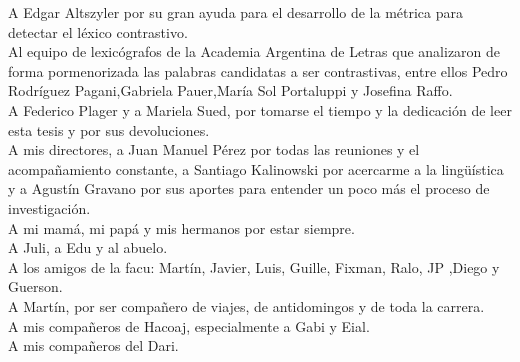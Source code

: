 \noindent A Edgar Altszyler por su gran ayuda para el desarrollo de  la métrica para detectar el léxico contrastivo.\\

\noindent Al equipo de lexicógrafos de la Academia Argentina de Letras que analizaron de forma pormenorizada las palabras candidatas a ser contrastivas, entre ellos Pedro Rodríguez Pagani,Gabriela Pauer,María Sol Portaluppi y Josefina Raffo.\\

\noindent A Federico Plager y a Mariela Sued, por tomarse el tiempo y la dedicación de leer esta tesis y por sus devoluciones.\\

\noindent A mis directores, a Juan Manuel Pérez por todas las reuniones y el acompañamiento constante, a Santiago Kalinowski por acercarme a la lingüística y a Agustín Gravano por sus aportes para entender un poco más el proceso de investigación.\\

\noindent A mi mamá, mi papá y mis hermanos por estar siempre.\\

\noindent A Juli, a Edu y al abuelo.\\

\noindent A los amigos de la facu: Martín, Javier, Luis, Guille, Fixman, Ralo, JP ,Diego y Guerson.\\

\noindent A Martín, por ser compañero de viajes, de antidomingos y de toda la carrera.\\

\noindent A mis compañeros de Hacoaj, especialmente a Gabi y Eial.\\

\noindent A mis compañeros del Dari.\\